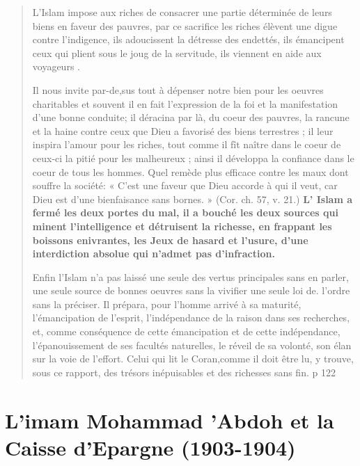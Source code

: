 \begin{quote}
L'Islam impose aux riches de consacrer une partie déterminée de leurs biens en faveur des pauvres, par ce sacrifice les riches élèvent une digue contre l'indigence, ils adoucissent la détresse des endettés, ils émancipent ceux qui plient sous le joug de la servitude, ils viennent en
aide aux voyageurs .
 
Il nous invite par-de,sus tout à dépenser notre bien pour les oeuvres
charitables et souvent il en fait l'expression de la foi et la manifestation
d'une bonne conduite; il déracina par là, du coeur des pauvres, la rancune
et la haine contre ceux que Dieu a favorisé des biens terrestres ; il leur
inspira l'amour pour les riches, tout comme il fît naître dans le coeur de
ceux-ci la pitié pour les malheureux ; ainsi il développa la confiance dans
le coeur de tous les hommes. Quel remède plus efficace contre les maux
dont souffre la société: « C'est une faveur que Dieu accorde à qui il veut,
car Dieu est d'une bienfaisance sans bornes. » (Cor. ch. 57, v. 21.)
\textbf{L' Islam a fermé les deux portes du mal, il a bouché les deux sources
qui minent l'intelligence et détruisent la richesse, en frappant les boissons
enivrantes, les Jeux de hasard et l'usure, d'une interdiction absolue qui
n'admet pas d'infraction.}

Enfin l'Islam n'a pas laissé une seule des vertus principales sans
en parler, une seule source de bonnes oeuvres sans la vivifier une seule
loi de. l'ordre sans la préciser. Il prépara, pour l'homme arrivé à sa
maturité, l'émancipation de l'esprit, l'indépendance de la raison dans
ses recherches, et, comme conséquence de cette émancipation et de
cette indépendance, l'épanouissement de ses facultés naturelles, le réveil
de sa volonté, son élan sur la voie de l'effort. Celui qui lit le Coran,comme
il doit être lu, y trouve, sous ce rapport, des trésors inépuisables et des
richesses sans fin.
p 122

\end{quote}


\section{L'imam Mohammad 'Abdoh et la Caisse d'Epargne (1903-1904)}

